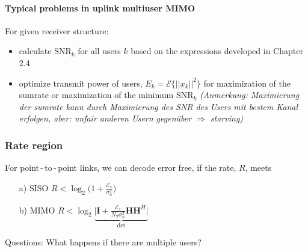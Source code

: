 \documentclass[a4paper, 10pt]{article}
\begin{document}
\paragraph*{Typical problems in uplink multiuser MIMO}
For given receiver structure:
\begin{itemize}
	\item calculate $\text{SNR}_k $ for all users $k $ based on the expressions developed in Chapter 2.4
	\item optimize transmit power of users, $E_k = \mathcal{E}\bigl\{||x_k||^2\bigr\} $ for maximization of the sumrate or maximization of the minimum $\text{SNR}_k $ \quad \textit{(Anmerkung: Maximierung der \textit{sumrate} kann durch Maximierung des SNR des Users mit bestem Kanal erfolgen, aber: unfair anderen Usern gegen\"uber $\Rightarrow $ \textit{starving})}
\end{itemize}
\subsubsection{Rate region}
For point\,-\,to\,-\,point links, we can decode error free, if the rate, $R$, meets
  \begin{itemize}
     \item[a)] SISO	$R < \log_2\bigl(1+\frac{\mathcal{E}_s}{\sigma_n^2}	\bigr) $
     \item[b)] MIMO $R < \log_2\underbrace{\bigl|\mathbf{I} + \frac{\mathcal{E}_s}{N_T\sigma_n^2} \mathbf{HH}^H\bigr|}_{\text{det}} $
	\end{itemize} 
Questions: What happens if there are multiple users?
\end{document}
